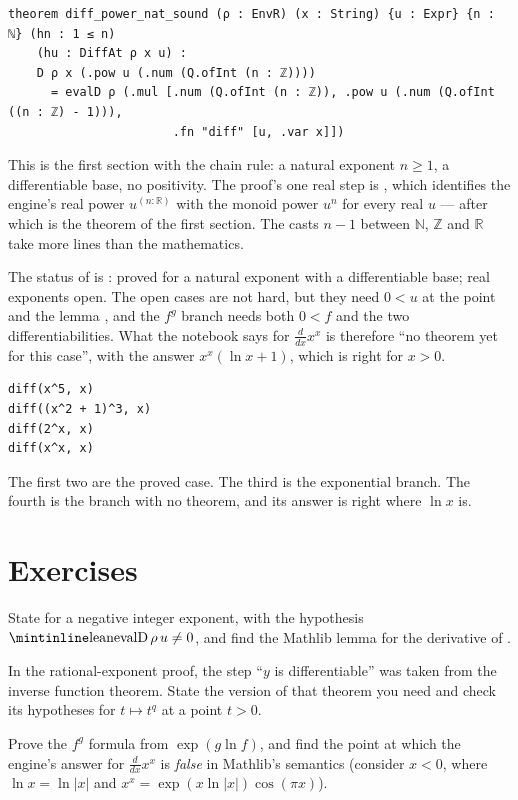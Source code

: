 \begin{verbatim}
theorem diff_power_nat_sound (ρ : EnvR) (x : String) {u : Expr} {n : ℕ} (hn : 1 ≤ n)
    (hu : DiffAt ρ x u) :
    D ρ x (.pow u (.num (Q.ofInt (n : ℤ))))
      = evalD ρ (.mul [.num (Q.ofInt (n : ℤ)), .pow u (.num (Q.ofInt ((n : ℤ) - 1))),
                       .fn "diff" [u, .var x]])
\end{verbatim}

This is the first section with the chain rule: a natural exponent $n \ge 1$, a differentiable
base, no positivity. The proof's one real step is , which identifies the
engine's real power $u^{(n : \mathbb{R})}$ with the monoid power $u^n$ for every real $u$ ---
after which  is the theorem of the first section. The casts $n - 1$ between
$\mathbb{N}$, $\mathbb{Z}$ and $\mathbb{R}$ take more lines than the mathematics.

The status of  is : proved for a natural exponent with a
differentiable base; real exponents open. The open cases are not hard, but they need
$0 < u$ at the point and the lemma , and the $f^g$ branch needs
both $0 < f$ and the two differentiabilities. What the notebook says for $\frac{d}{dx} x^x$ is
therefore ``no theorem yet for this case'', with the answer $x^x(\ln x + 1)$, which is right for
$x > 0$.

\begin{trybox}
\begin{verbatim}
diff(x^5, x)
diff((x^2 + 1)^3, x)
diff(2^x, x)
diff(x^x, x)
\end{verbatim}
  The first two are the proved case. The third is the exponential branch. The fourth is the
  branch with no theorem, and its answer is right where $\ln x$ is.
\end{trybox}

\section{Exercises}

\begin{exercisebox}
  State  for a negative integer exponent, with the hypothesis
  $\lc{evalD}\,\rho\,u \neq 0$, and find the Mathlib lemma for the derivative of .
\end{exercisebox}

\begin{exercisebox}
  In the rational-exponent proof, the step ``$y$ is differentiable'' was taken from the inverse
  function theorem. State the version of that theorem you need and check its hypotheses for
  $t \mapsto t^q$ at a point $t > 0$.
\end{exercisebox}

\begin{exercisebox}
  Prove the $f^g$ formula from $\exp(g \ln f)$, and find the point at which the engine's answer
  for $\frac{d}{dx} x^x$ is \emph{false} in Mathlib's semantics (consider $x < 0$, where
  $\ln x = \ln|x|$ and $x^x = \exp(x \ln|x|)\cos(\pi x)$).
\end{exercisebox}
